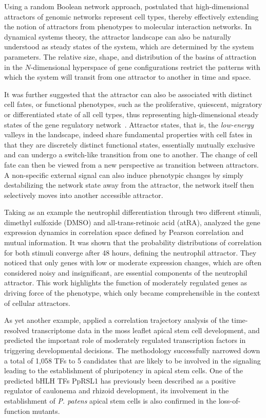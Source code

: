 Using a random Boolean network approach, \cite{Kauffman1969a} postulated that high-dimensional attractors of genomic networks represent cell types, thereby effectively
extending the notion of attractors from phenotypes to molecular interaction
networks.
In dynamical systems theory, the attractor landscape can also be naturally 
understood as steady states of the system, which are determined by the system 
parameters.
The relative size, shape, and distribution of the basins of
attraction in the $N$-dimensional hyperspace of gene configurations restrict the patterns with which the system will
transit from one attractor to another in time and space.

It was further suggested that the attractor can also be associated with distinct cell fates, or functional phenotypes, such as the proliferative, quiescent, migratory or differentiated state of all cell types, thus representing high-dimensional 
steady states of the gene regulatory network~\citep{Huang2006,Huang2005}.
Attractor states, that is, the \emph{low-energy} valleys in the landscape, indeed share fundamental properties with cell fates in that they are discretely distinct functional states, essentially mutually exclusive and can undergo a switch-like transition from one to another. The change of cell fate can then be viewed from a new
perspective as transition between
attractors. A non-specific external signal can also induce phenotypic changes by
simply destabilizing the network state 
away from the attractor, the network itself then selectively moves into another
accessible attractor.

Taking as an example the neutrophil differentiation through two different stimuli, dimethyl sulfoxide (DMSO) and all-trans-retinoic acid (atRA), \cite{Tsuchiya2010}
analyzed the gene expression dynamics in correlation space defined by Pearson correlation and mutual information. It was shown that the probability distributions of
correlation for both stimuli converge after 48 hours, defining the neutrophil attractor. They noticed that only genes with low or moderate expression changes, which are often considered noisy and insignificant, are essential components of the neutrophil attractor. This work highlights the function of moderately regulated genes as 
driving force of the phenotype, which only became comprehensible in the context
of cellular attractors.

As yet another example, \cite{Busch2013} applied a correlation trajectory analysis of the 
time-resolved transcriptome data in the moss leaflet apical stem cell development, 
and predicted the important role of 
moderately regulated transcription factors in triggering developmental 
decisions. The methodology successfully narrowed down a total of 1,058 TFs to 
5 candidates that are likely to be involved in the signaling leading to the establishment of pluripotency in apical stem cells. One of the predicted bHLH TFs PpRSL1 has previously been described as a positive regulator of caulonema and rhizoid development, 
its involvement in the establishment of \emph{P. patens} apical stem cells is also confirmed
in the loss-of-function mutants.

